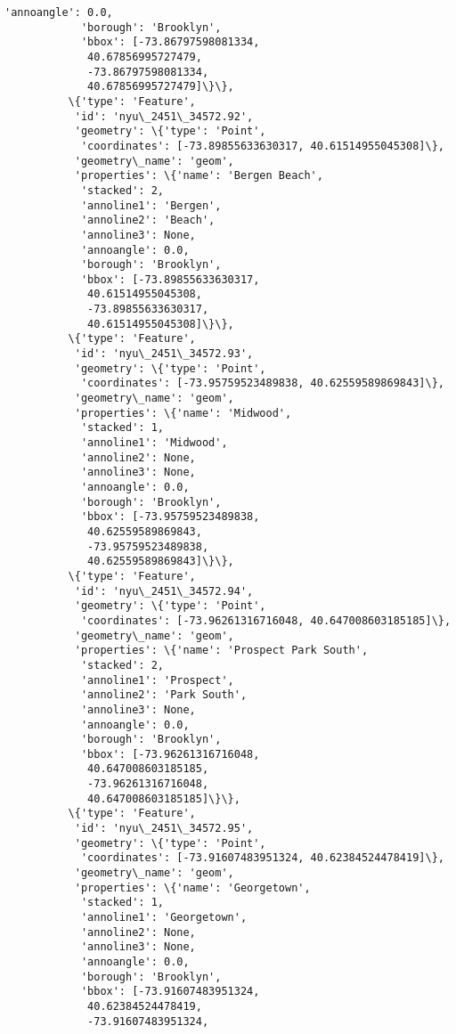\documentclass[11pt]{article}
\begin{document}
\begin{Verbatim}[commandchars=\\\{\}]
            'annoangle': 0.0,
            'borough': 'Brooklyn',
            'bbox': [-73.86797598081334,
             40.67856995727479,
             -73.86797598081334,
             40.67856995727479]\}\},
          \{'type': 'Feature',
           'id': 'nyu\_2451\_34572.92',
           'geometry': \{'type': 'Point',
            'coordinates': [-73.89855633630317, 40.61514955045308]\},
           'geometry\_name': 'geom',
           'properties': \{'name': 'Bergen Beach',
            'stacked': 2,
            'annoline1': 'Bergen',
            'annoline2': 'Beach',
            'annoline3': None,
            'annoangle': 0.0,
            'borough': 'Brooklyn',
            'bbox': [-73.89855633630317,
             40.61514955045308,
             -73.89855633630317,
             40.61514955045308]\}\},
          \{'type': 'Feature',
           'id': 'nyu\_2451\_34572.93',
           'geometry': \{'type': 'Point',
            'coordinates': [-73.95759523489838, 40.62559589869843]\},
           'geometry\_name': 'geom',
           'properties': \{'name': 'Midwood',
            'stacked': 1,
            'annoline1': 'Midwood',
            'annoline2': None,
            'annoline3': None,
            'annoangle': 0.0,
            'borough': 'Brooklyn',
            'bbox': [-73.95759523489838,
             40.62559589869843,
             -73.95759523489838,
             40.62559589869843]\}\},
          \{'type': 'Feature',
           'id': 'nyu\_2451\_34572.94',
           'geometry': \{'type': 'Point',
            'coordinates': [-73.96261316716048, 40.647008603185185]\},
           'geometry\_name': 'geom',
           'properties': \{'name': 'Prospect Park South',
            'stacked': 2,
            'annoline1': 'Prospect',
            'annoline2': 'Park South',
            'annoline3': None,
            'annoangle': 0.0,
            'borough': 'Brooklyn',
            'bbox': [-73.96261316716048,
             40.647008603185185,
             -73.96261316716048,
             40.647008603185185]\}\},
          \{'type': 'Feature',
           'id': 'nyu\_2451\_34572.95',
           'geometry': \{'type': 'Point',
            'coordinates': [-73.91607483951324, 40.62384524478419]\},
           'geometry\_name': 'geom',
           'properties': \{'name': 'Georgetown',
            'stacked': 1,
            'annoline1': 'Georgetown',
            'annoline2': None,
            'annoline3': None,
            'annoangle': 0.0,
            'borough': 'Brooklyn',
            'bbox': [-73.91607483951324,
             40.62384524478419,
             -73.91607483951324,

\end{Verbatim}
\end{document}
